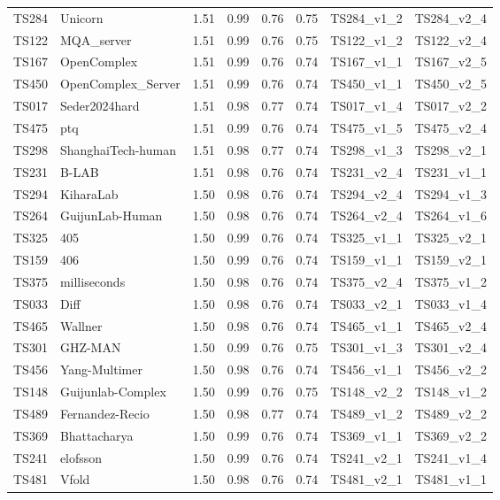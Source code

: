 \begin{longtable}{llllllll}
TS284 & Unicorn & 1.51 & 0.99 & 0.76 & 0.75 & TS284\_v1\_2 & TS284\_v2\_4 \\ 
TS122 & MQA\_server & 1.51 & 0.99 & 0.76 & 0.75 & TS122\_v1\_2 & TS122\_v2\_4 \\ 
TS167 & OpenComplex & 1.51 & 0.99 & 0.76 & 0.74 & TS167\_v1\_1 & TS167\_v2\_5 \\ 
TS450 & OpenComplex\_Server & 1.51 & 0.99 & 0.76 & 0.74 & TS450\_v1\_1 & TS450\_v2\_5 \\ 
TS017 & Seder2024hard & 1.51 & 0.98 & 0.77 & 0.74 & TS017\_v1\_4 & TS017\_v2\_2 \\ 
TS475 & ptq & 1.51 & 0.99 & 0.76 & 0.74 & TS475\_v1\_5 & TS475\_v2\_4 \\ 
TS298 & ShanghaiTech-human & 1.51 & 0.98 & 0.77 & 0.74 & TS298\_v1\_3 & TS298\_v2\_1 \\ 
TS231 & B-LAB & 1.51 & 0.98 & 0.76 & 0.74 & TS231\_v2\_4 & TS231\_v1\_1 \\ 
TS294 & KiharaLab & 1.50 & 0.98 & 0.76 & 0.74 & TS294\_v2\_4 & TS294\_v1\_3 \\ 
TS264 & GuijunLab-Human & 1.50 & 0.98 & 0.76 & 0.74 & TS264\_v2\_4 & TS264\_v1\_6 \\ 
TS325 & 405 & 1.50 & 0.99 & 0.76 & 0.74 & TS325\_v1\_1 & TS325\_v2\_1 \\ 
TS159 & 406 & 1.50 & 0.99 & 0.76 & 0.74 & TS159\_v1\_1 & TS159\_v2\_1 \\ 
TS375 & milliseconds & 1.50 & 0.98 & 0.76 & 0.74 & TS375\_v2\_4 & TS375\_v1\_2 \\ 
TS033 & Diff & 1.50 & 0.98 & 0.76 & 0.74 & TS033\_v2\_1 & TS033\_v1\_4 \\ 
TS465 & Wallner & 1.50 & 0.98 & 0.76 & 0.74 & TS465\_v1\_1 & TS465\_v2\_4 \\ 
TS301 & GHZ-MAN & 1.50 & 0.99 & 0.76 & 0.75 & TS301\_v1\_3 & TS301\_v2\_4 \\ 
TS456 & Yang-Multimer & 1.50 & 0.98 & 0.76 & 0.74 & TS456\_v1\_1 & TS456\_v2\_2 \\ 
TS148 & Guijunlab-Complex & 1.50 & 0.99 & 0.76 & 0.75 & TS148\_v2\_2 & TS148\_v1\_2 \\ 
TS489 & Fernandez-Recio & 1.50 & 0.98 & 0.77 & 0.74 & TS489\_v1\_2 & TS489\_v2\_2 \\ 
TS369 & Bhattacharya & 1.50 & 0.99 & 0.76 & 0.74 & TS369\_v1\_1 & TS369\_v2\_2 \\ 
TS241 & elofsson & 1.50 & 0.99 & 0.76 & 0.74 & TS241\_v2\_1 & TS241\_v1\_4 \\ 
TS481 & Vfold & 1.50 & 0.98 & 0.76 & 0.74 & TS481\_v2\_1 & TS481\_v1\_1 \\ 

\end{longtable}
